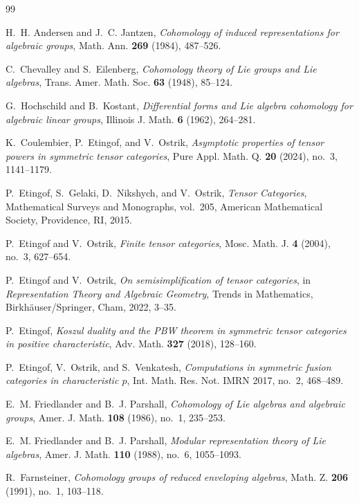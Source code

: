 \documentclass[12pt]{amsart}
\theoremstyle{remark}
\begin{document}
\begin{thebibliography}{99}

H.~H. Andersen and J.~C. Jantzen,
\emph{Cohomology of induced representations for algebraic groups},
Math. Ann. \textbf{269} (1984), 487--526.

C.~Chevalley and S.~Eilenberg,
\emph{Cohomology theory of Lie groups and Lie algebras},
Trans. Amer. Math. Soc. \textbf{63} (1948), 85--124.

G.~Hochschild and B.~Kostant,
\emph{Differential forms and Lie algebra cohomology for algebraic linear groups},
Illinois J. Math. \textbf{6} (1962), 264--281.

K.~Coulembier, P.~Etingof, and V.~Ostrik,
\emph{Asymptotic properties of tensor powers in symmetric tensor categories},
Pure Appl. Math. Q. \textbf{20} (2024), no.~3, 1141--1179.

P.~Etingof, S.~Gelaki, D.~Nikshych, and V.~Ostrik,
\emph{Tensor Categories},
Mathematical Surveys and Monographs, vol.~205,
American Mathematical Society, Providence, RI, 2015.

P.~Etingof and V.~Ostrik,
\emph{Finite tensor categories},
Mosc. Math. J. \textbf{4} (2004), no.~3, 627--654.

P.~Etingof and V.~Ostrik,
\emph{On semisimplification of tensor categories},
in \emph{Representation Theory and Algebraic Geometry},
Trends in Mathematics, Birkh\"auser/Springer, Cham, 2022, 3--35.

P.~Etingof,
\emph{Koszul duality and the PBW theorem in symmetric tensor categories in
positive characteristic},
Adv. Math. \textbf{327} (2018), 128--160.

P.~Etingof, V.~Ostrik, and S.~Venkatesh,
\emph{Computations in symmetric fusion categories in characteristic $p$},
Int. Math. Res. Not. IMRN 2017, no.~2, 468--489.

E.~M. Friedlander and B.~J. Parshall,
\emph{Cohomology of Lie algebras and algebraic groups},
Amer. J. Math. \textbf{108} (1986), no.~1, 235--253.

E.~M. Friedlander and B.~J. Parshall,
\emph{Modular representation theory of Lie algebras},
Amer. J. Math. \textbf{110} (1988), no.~6, 1055--1093.

R.~Farnsteiner,
\emph{Cohomology groups of reduced enveloping algebras},
Math. Z. \textbf{206} (1991), no.~1, 103--118.


\end{thebibliography}
\end{document}
